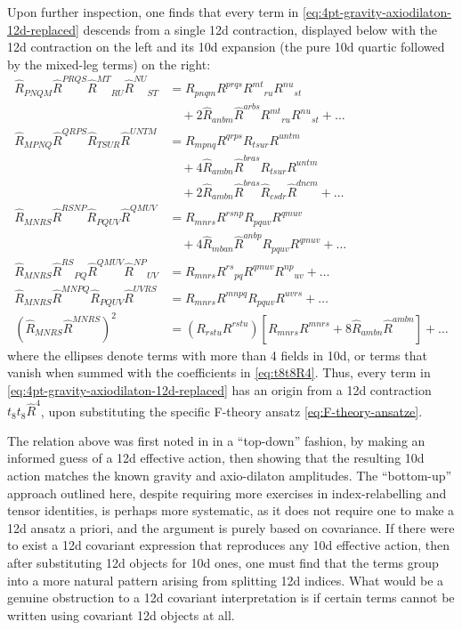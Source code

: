 Upon further inspection, one finds that every term in \eqref{eq:4pt-gravity-axiodilaton-12d-replaced} descends from a single 12d contraction, displayed below with the 12d contraction on the left and its 10d expansion (the pure 10d quartic followed by the mixed-leg terms) on the right:
\begin{equation}
\begin{aligned}
\widehat{R}_{PNQM} \widehat{R}^{PRQS} \widehat{R}^{MT}{}_{RU} \widehat{R}^{NU}{}_{ST}
&= R_{pnqm} R^{prqs} R^{mt}{}_{ru} R^{nu}{}_{st}\\
&\quad + 2 \widehat{R}_{anbm} \widehat{R}^{arbs} R^{mt}{}_{ru} R^{nu}{}_{st}+ \ldots\\
\widehat{R}_{MPNQ} \widehat{R}^{QRPS} \widehat{R}_{TSUR} \widehat{R}^{UNTM}
&= R_{mpnq} R^{qrps} R_{tsur} R^{untm}\\
&\quad + 4 \widehat{R}_{ambn} \widehat{R}^{bras} R_{tsur} R^{untm}\\
&\quad + 2 \widehat{R}_{ambn} \widehat{R}^{bras} \widehat{R}_{csdr} \widehat{R}^{dncm}+ \ldots\\
\widehat{R}_{MNRS} \widehat{R}^{RSNP} \widehat{R}_{PQUV} \widehat{R}^{QMUV}
&= R_{mnrs} R^{rsnp} R_{pquv} R^{qmuv}\\
&\quad + 4 \widehat{R}_{mban} \widehat{R}^{anbp} R_{pquv} R^{qmuv}+ \ldots\\
\widehat{R}_{MNRS} \widehat{R}^{RS}{}_{PQ} \widehat{R}^{QMUV} \widehat{R}^{NP}{}_{UV}
&= R_{mnrs} R^{rs}{}_{pq} R^{qmuv} R^{np}{}_{uv}+ \ldots\\
\widehat{R}_{MNRS} \widehat{R}^{MNPQ} \widehat{R}_{PQUV} \widehat{R}^{UVRS}
&= R_{mnrs} R^{mnpq} R_{pquv} R^{uvrs}+ \ldots\\
(\widehat{R}_{MNRS}\widehat{R}^{MNRS})^2
&= (R_{rstu} R^{rstu})
\left[R_{mnrs} R^{mnrs}+ 8 \widehat{R}_{ambn} \widehat{R}^{ambn}\right]+ \ldots
\end{aligned}
\end{equation}
where the ellipses denote terms with more than 4 fields in 10d, or terms that vanish when summed with the coefficients in \eqref{eq:t8t8R4}.
Thus, every term in \eqref{eq:4pt-gravity-axiodilaton-12d-replaced} has an origin from a 12d contraction $t_8 t_8 \widehat{R}^4$, upon substituting the specific F-theory ansatz \eqref{eq:F-theory-ansatze}.

The relation above was first noted in \cite{Minasian:2015bxa} in a ``top-down'' fashion, by making an informed guess of a 12d effective action, then showing that the resulting 10d action matches the known gravity and axio-dilaton amplitudes.
The ``bottom-up'' approach outlined here, despite requiring more exercises in index-relabelling and tensor identities, is perhaps more systematic, as it does not require one to make a 12d ansatz a priori, and the argument is purely based on covariance.
If there were to exist a 12d covariant expression that reproduces any 10d effective action, then after substituting 12d objects for 10d ones, one must find that the terms group into a more natural pattern arising from splitting 12d indices.
What would be a genuine obstruction to a 12d covariant interpretation is if certain terms cannot be written using covariant 12d objects at all.


